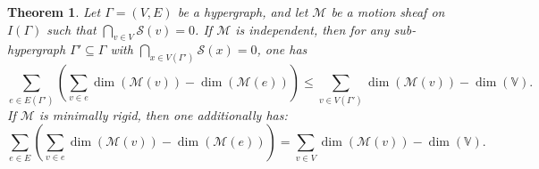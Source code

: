 \documentclass{article}
\newtheorem{theorem}{Theorem}[section]
\theoremstyle{definition}
\theoremstyle{remark}
\begin{document}
\begin{theorem}\label{thm: Necessary condition}
Let $\Gamma=(V,E)$ be a hypergraph, and let $\mathcal{M}$ be a motion sheaf on $I(\Gamma)$ such that $\bigcap_{v\in V} \mathcal{S}(v) = 0$. If $\mathcal{M}$ is independent, then for any sub-hypergraph $\Gamma' \subseteq \Gamma$ with $\bigcap_{x\in V(\Gamma')} \mathcal{S}(x) = 0$, one has 
\begin{equation}\label{ineq}
\sum_{e \in E(\Gamma')}\left( \sum_{v\in e} \dim\left(\mathcal{M}(v)\right) - \dim\left(\mathcal{M}(e)\right) \right) \leq \sum_{v \in V(\Gamma')} \dim(\mathcal{M}(v)) - \dim(\mathbb{V}).
\end{equation}
If $\mathcal{M}$ is minimally rigid, then one additionally has:
\begin{equation} \label{eq: equality in nec_cond}
\sum_{e \in E}\left( \sum_{v\in e} \dim\left(\mathcal{M}(v)\right) - \dim\left(\mathcal{M}(e)\right) \right) = \sum_{v \in V} \dim(\mathcal{M}(v)) - \dim(\mathbb{V}).
\end{equation}
\end{theorem} 
\end{document}
